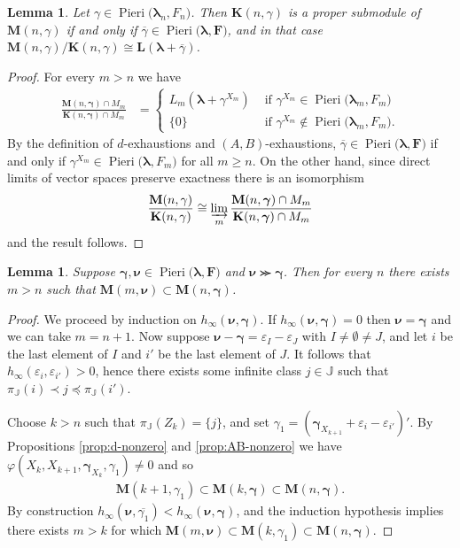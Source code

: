 \documentclass[11pt,fleqn]{amsart}
\newcommand\JJ{\mathbb J}
\renewcommand\phi{\varphi}
\renewcommand\epsilon{\varepsilon}
\newtheorem{lem}[thm]{Lemma}
\theoremstyle{definition}
\theoremstyle{remark}
\theoremstyle{remark}
\newcommand\wt[1]{\boldsymbol{#1}}
\newcommand\Pieri[2]{\operatorname{Pieri}{(#1},{#2)}}
\newcommand\map[4]{\phi(#3,#4,#1,#2)}
\begin{document}
\begin{lem}
\label{lem:MK-quotient}
Let $\gamma \in \Pieri{\wt\lambda_n}{F_n}$. Then $\mathbf K(n,\gamma)$ is 
a proper submodule of $\mathbf M(n,\gamma)$ if and only if $\overline{\gamma} 
\in \Pieri{\wt\lambda}{\mathbf F}$, and in that case $\mathbf M(n,\gamma) / 
\mathbf K(n,\gamma) \cong \mathbf L(\wt\lambda + \overline{\gamma})$.
\end{lem}
\begin{proof}
For every $m > n$ we have
\begin{align*}
  \frac{\mathbf M(n,\wt\gamma) \cap M_m}{\mathbf K(n,\wt\gamma) \cap M_m}
    &= \begin{cases}
      L_m(\wt\lambda + \gamma^{X_m})  
        & \mbox{ if } \gamma^{X_m} \in \Pieri{\wt\lambda_m}{F_m} \\
      \{0\}
        & \mbox{ if } \gamma^{X_m} \notin \Pieri{\wt\lambda_m}{F_m}.
    \end{cases}
\end{align*}
By the definition of $d$-exhaustions and $(A,B)$-exhaustions, 
$\overline{\gamma} \in \Pieri{\wt\lambda}{\mathbf F}$ if and only if 
$\gamma^{X_m} \in \Pieri{\wt\lambda}{F_m}$ for all $m \geq n$. On the other 
hand, since direct limits of vector spaces preserve exactness there is an 
isomorphism
\[
  \frac{\mathbf M(n,\gamma)}{\mathbf K(n,\gamma)} 
    \cong \varinjlim_m \frac{\mathbf M(n,\wt\gamma) \cap M_m}{\mathbf K(n,\wt\gamma) \cap M_m}
\]
and the result follows.
\end{proof}

\begin{lem}
\label{lem:ggcurly-M}
Suppose $\wt\gamma, \wt\nu \in \Pieri{\wt\lambda}{\mathbf F}$ and $\wt\nu 
\ggcurly \wt \gamma$. Then for every $n$ there exists $m > n$ such that 
$\mathbf M(m,\wt\nu) \subset \mathbf M(n,\wt\gamma)$.
\end{lem}
\begin{proof}
We proceed by induction on $h_{\infty}(\wt\nu,\wt\gamma)$. If $h_{\infty}
(\wt\nu,\wt\gamma) = 0$ then $\wt\nu = \wt\gamma$ and we can take $m = n + 1$. 
Now suppose $\wt\nu - \wt\gamma = \epsilon_I - \epsilon_J$ with $I \neq 
\emptyset \neq J$, and let $i$ be the last element of $I$ and $i'$ be the 
last element of $J$. It follows that $h_{\infty}(\epsilon_{i}, 
\epsilon_{i'}) > 0$, hence there exists some infinite class $j \in \JJ$ such 
that $\pi_{\JJ}(i) \prec j \preceq \pi_{\JJ}(i')$. 

Choose $k > n$ such that $\pi_\JJ(Z_k) = \{j\}$, and set $\gamma_1 = 
(\wt\gamma_{X_{k+1}} + \epsilon_i - \epsilon_{i'})'$. By Propositions 
\ref{prop:d-nonzero} and \ref{prop:AB-nonzero} we have $\map{\wt\gamma_{X_k}}
{\gamma_1}{X_k}{X_{k+1}} \neq 0$ and so
\begin{align*}
  \mathbf M(k+1,\gamma_1) 
    \subset \mathbf M(k, \wt\gamma)
    \subset \mathbf M(n,\wt\gamma).
\end{align*}
By construction $h_\infty(\wt\nu,\overline{\gamma_1}) < h_{\infty}(\wt\nu,
\wt\gamma)$, and the induction hypothesis implies there exists $m > k$ 
for which $\mathbf M(m,\wt\nu) \subset \mathbf M(k,\gamma_1) \subset 
\mathbf M(n,\wt\gamma)$.
\end{proof}
\end{document}
